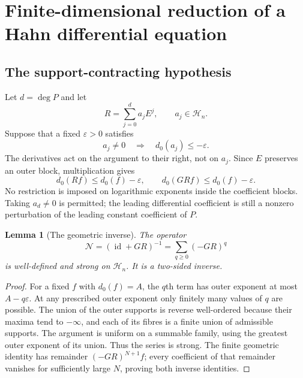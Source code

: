 \documentclass[11pt,a4paper]{article}
\numberwithin{equation}{section}
\newtheorem{lemma}[lemma]{Lemma}
\theoremstyle{definition}
\theoremstyle{remark}
\newcommand{\HH}{\mathcal H}
\newcommand{\id}{\operatorname{id}}
\newcommand{\dprim}{d_0}
\newcommand{\eps}{\varepsilon}
\newcommand{\shift}{\mathcal N}
\begin{document}
\section{Finite-dimensional reduction of a Hahn differential equation}
\label{sec:fredholm}

\subsection{The support-contracting hypothesis}
Let $d=\deg P$ and let
\begin{equation}
 R=\sum_{j=0}^{d}a_j E^j,\qquad a_j\in\HH_n.
 \label{eq:perturbation}
\end{equation}
Suppose that a fixed $\eps>0$ satisfies
\begin{equation}
 a_j\ne0\quad\Longrightarrow\quad\dprim(a_j)\le-\eps.
 \label{eq:strict-outer-drop}
\end{equation}
The derivatives act on the argument to their right, not on $a_j$. Since $E$ preserves an outer block, multiplication gives
\begin{equation}
 \dprim(Rf)\le\dprim(f)-\eps,
 \qquad \dprim(GRf)\le\dprim(f)-\eps.
 \label{eq:drop}
\end{equation}
No restriction is imposed on logarithmic exponents inside the coefficient blocks. Taking $a_d\ne0$ is permitted; the leading differential coefficient is still a nonzero perturbation of the leading constant coefficient of $P$.

\begin{lemma}[The geometric inverse]
\label{lem:geometric}
The operator
\begin{equation}
 \shift=(\id+GR)^{-1}
       =\sum_{q\ge0}(-GR)^q
 \label{eq:neumann}
\end{equation}
is well-defined and strong on $\HH_n$. It is a two-sided inverse.
\end{lemma}
\begin{proof}
For a fixed $f$ with $\dprim(f)=A$, the $q$th term has outer exponent at most $A-q\eps$. At any prescribed outer exponent only finitely many values of $q$ are possible. The union of the outer supports is reverse well-ordered because their maxima tend to $-\infty$, and each of its fibres is a finite union of admissible supports. The argument is uniform on a summable family, using the greatest outer exponent of its union. Thus the series is strong. The finite geometric identity has remainder $(-GR)^{N+1}f$; every coefficient of that remainder vanishes for sufficiently large $N$, proving both inverse identities.
\end{proof}
\end{document}
